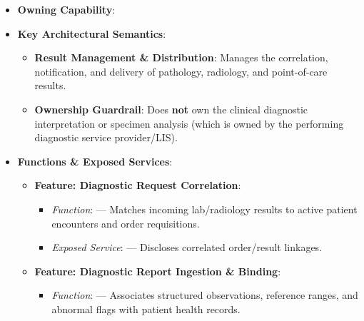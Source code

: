 \begin{itemize}

\item
\textbf{Owning Capability}: \texttt{}



\item
\textbf{Key Architectural Semantics}:


\begin{itemize}

\item
\textbf{Result Management \& Distribution}: Manages the correlation, notification, and delivery of pathology, radiology, and point-of-care results.



\item
\textbf{Ownership Guardrail}: Does \textbf{not} own the clinical diagnostic interpretation or specimen analysis (which is owned by the performing diagnostic service provider/\allowbreak{}LIS).



\end{itemize}


\item
\textbf{Functions \& Exposed Services}:


\begin{itemize}

\item
\textbf{Feature: Diagnostic Request Correlation}:


\begin{itemize}

\item
\emph{Function}: \texttt{} — Matches incoming lab/\allowbreak{}radiology results to active patient encounters and order requisitions.



\item
\emph{Exposed Service}: \texttt{} — Discloses correlated order/\allowbreak{}result linkages.



\end{itemize}


\item
\textbf{Feature: Diagnostic Report Ingestion \& Binding}:


\begin{itemize}

\item
\emph{Function}: \texttt{} — Associates structured observations, reference ranges, and abnormal flags with patient health records.




\end{itemize}
\end{itemize}
\end{itemize}
